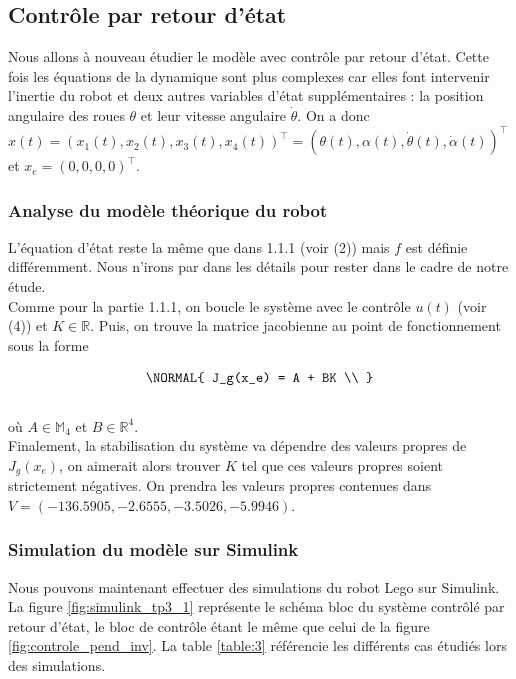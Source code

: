 \documentclass[11pt,french]{article} %
\begin{document}
\subsection{Contrôle par retour d'état}

Nous allons à nouveau étudier le modèle avec contrôle par retour d'état. Cette fois les équations de la dynamique sont plus complexes car elles font intervenir l'inertie du robot et deux autres variables d'état supplémentaires : la position angulaire des roues $\theta$ et leur vitesse angulaire $\dot\theta$. On a donc $x(t) = (x_1(t),x_2(t),x_3(t),x_4(t))^\intercal = (\theta(t),\alpha(t),\dot\theta(t),\dot\alpha(t))^\intercal$ et $x_e = (0,0,0,0)^\intercal$. \\

\subsubsection{Analyse du modèle théorique du robot}

L'équation d'état reste la même que dans 1.1.1 (voir (2)) mais $f$ est définie différemment. Nous n'irons par dans les détails pour rester dans le cadre de notre étude.\\
Comme pour la partie 1.1.1, on boucle le système avec le contrôle $u(t)$ (voir (4)) et $K \in \mathbb{R}$. Puis, on trouve la matrice jacobienne au point de fonctionnement sous la forme

\begin{equation}
	\NORMAL{
			J_g(x_e) = A + BK \\
	}
\end{equation}\\

où $A \in \mathbb{M}_4$ et $B \in \mathbb{R}^4$. \\

Finalement, la stabilisation du système va dépendre des valeurs propres de $J_g(x_e)$, on aimerait alors trouver $K$ tel que ces valeurs propres soient strictement négatives. On prendra les valeurs propres contenues dans $V = (-136.5905, -2.6555, -3.5026, -5.9946)$. \\

\subsubsection{Simulation du modèle sur Simulink}

Nous pouvons maintenant effectuer des simulations du robot Lego sur Simulink. La figure \ref{fig:simulink_tp3_1} représente le schéma bloc du système contrôlé par retour d'état, le bloc de contrôle étant le même que celui de la figure \ref{fig:controle_pend_inv}. La table \ref{table:3} référencie les différents cas étudiés lors des simulations. \\
\end{document}
